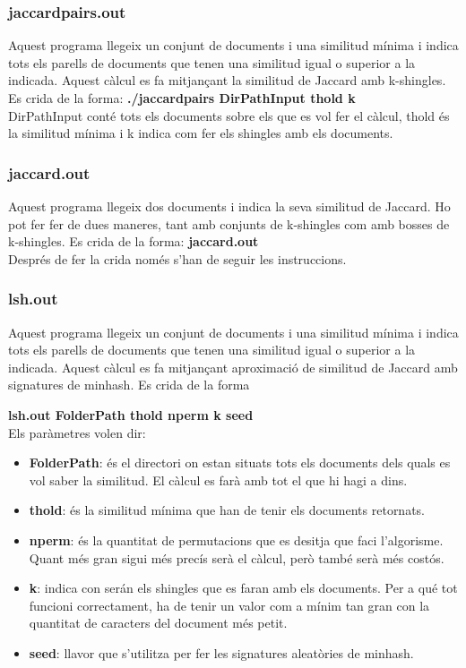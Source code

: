 \documentclass[a4paper, titlepage, 12pt]{report}
\begin{document}
\subsubsection{jaccard\textunderscore pairs.out}
Aquest programa llegeix un conjunt de documents i una similitud mínima i indica tots els parells de documents que tenen una similitud igual o superior a la indicada. Aquest càlcul es fa mitjançant la similitud de Jaccard amb k-shingles. Es crida de la forma:
\textbf{./jaccard\textunderscore pairs DirPathInput thold k}
\\
DirPathInput conté tots els documents sobre els que es vol fer el càlcul, thold és la similitud mínima i k indica com fer els shingles amb els documents.

\subsubsection{jaccard.out}
Aquest programa llegeix dos documents i indica la seva similitud de Jaccard. Ho pot fer fer de dues maneres, tant amb conjunts de k-shingles com amb bosses de k-shingles. Es crida de la forma:
\textbf{jaccard.out}
\\
Després de fer la crida només s'han de seguir les instruccions.

\subsubsection{lsh.out}
Aquest programa llegeix un conjunt de documents i una similitud mínima i indica tots els parells de documents que tenen una similitud igual o superior a la indicada. Aquest càlcul es fa mitjançant aproximació de similitud de Jaccard amb signatures de minhash. Es crida de la forma

 \textbf{lsh.out FolderPath thold nperm k seed}
\\
Els paràmetres volen dir:
\begin{itemize}
 \item \textbf{FolderPath}: és el directori on estan situats tots els documents dels quals es vol saber la similitud. El càlcul es farà amb tot el que hi hagi a dins.
 \item \textbf{thold}: és la similitud mínima que han de tenir els documents retornats.
 \item \textbf{nperm}: és la quantitat de permutacions que es desitja que faci l'algorisme. Quant més gran sigui més precís serà el càlcul, però també serà més costós.
 \item \textbf{k}: indica con serán els shingles que es faran amb els documents. Per a qué tot funcioni correctament, ha de tenir un valor com a mínim tan gran con la quantitat de caracters del document més petit.
 \item \textbf{seed}: llavor que s'utilitza per fer les signatures aleatòries de minhash.
\end{itemize}
\end{document}
